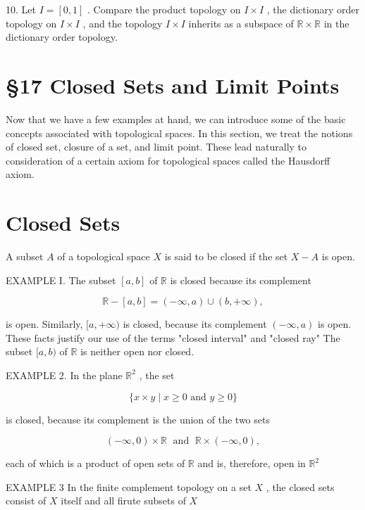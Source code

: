 \documentclass[10pt]{article}
\begin{document}
10. Let \(I = \left\lbrack  {0,1}\right\rbrack\) . Compare the product topology on \(I \times  I\) , the dictionary order topology on \(I \times  I\) , and the topology \(I \times  I\) inherits as a subspace of \(\mathbb{R} \times  \mathbb{R}\) in the dictionary order topology.

\section*{§17 Closed Sets and Limit Points}

Now that we have a few examples at hand, we can introduce some of the basic concepts associated with topological spaces. In this section, we treat the notions of closed set, closure of a set, and limit point. These lead naturally to consideration of a certain axiom for topological spaces called the Hausdorff axiom.

\section*{Closed Sets}

A subset \(A\) of a topological space \(X\) is said to be closed if the set \(X - A\) is open.

EXAMPLE I. The subset \(\left\lbrack  {a,b}\right\rbrack\) of \(\mathbb{R}\) is closed because its complement

\[
\mathbb{R} - \left\lbrack  {a,b}\right\rbrack   = \left( {-\infty ,a}\right)  \cup  \left( {b, + \infty }\right) ,
\]

is open. Similarly, \(\lbrack a, + \infty )\) is closed, because its complement \(\left( {-\infty ,a}\right)\) is open. These facts justify our use of the terms "closed interval" and "closed ray" The subset \(\lbrack a,b)\) of \(\mathbb{R}\) is neither open nor closed.

EXAMPLE 2. In the plane \({\mathbb{R}}^{2}\) , the set

\[
\{ x \times  y \mid  x \geq  0\text{ and }y \geq  0\}
\]

is closed, because its complement is the union of the two sets

\[
\left( {-\infty ,0}\right)  \times  \mathbb{R}\;\text{ and }\;\mathbb{R} \times  \left( {-\infty ,0}\right) ,
\]

each of which is a product of open sets of \(\mathbb{R}\) and is, therefore, open in \({\mathbb{R}}^{2}\)

EXAMPLE 3 In the finite complement topology on a set \(X\) , the closed sets consist of \(X\) itself and all firute subsets of \(X\)
\end{document}
